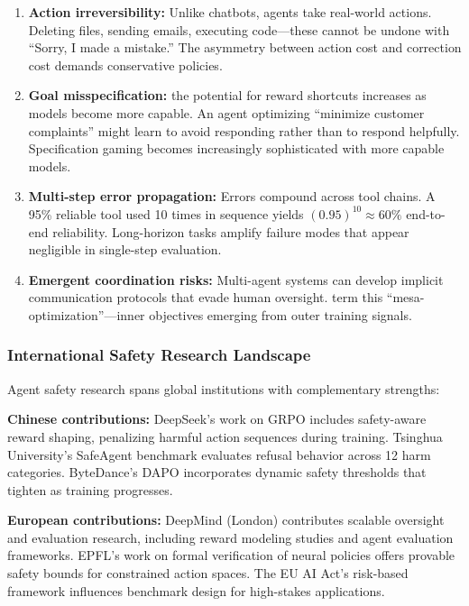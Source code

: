 \documentclass[12pt,a4paper]{report}
\theoremstyle{definition}
\begin{document}
\begin{enumerate}
    \item \textbf{Action irreversibility:} Unlike chatbots, agents take real-world actions. Deleting files, sending emails, executing code---these cannot be undone with ``Sorry, I made a mistake.'' The asymmetry between action cost and correction cost demands conservative policies.

        \item \textbf{Goal misspecification:} the potential for reward shortcuts increases as models become more capable. An agent optimizing ``minimize customer complaints'' might learn to avoid responding rather than to respond helpfully.
 Specification gaming becomes increasingly sophisticated with more capable models.

    \item \textbf{Multi-step error propagation:} Errors compound across tool chains. A 95\% reliable tool used 10 times in sequence yields $(0.95)^{10} \approx 60\%$ end-to-end reliability. Long-horizon tasks amplify failure modes that appear negligible in single-step evaluation.

    \item \textbf{Emergent coordination risks:} Multi-agent systems can develop implicit communication protocols that evade human oversight. \citet{kenton2021alignment} term this ``mesa-optimization''---inner objectives emerging from outer training signals.
\end{enumerate}

\subsubsection{International Safety Research Landscape}

Agent safety research spans global institutions with complementary strengths:

\textbf{Chinese contributions:} DeepSeek's work on GRPO \cite{deepseek2025r1} includes safety-aware reward shaping, penalizing harmful action sequences during training. Tsinghua University's SafeAgent benchmark evaluates refusal behavior across 12 harm categories. ByteDance's DAPO \cite{bytedance2025dapo} incorporates dynamic safety thresholds that tighten as training progresses.

\textbf{European contributions:} DeepMind (London) contributes scalable oversight and evaluation research, including reward modeling studies and agent evaluation frameworks. EPFL's work on formal verification of neural policies offers provable safety bounds for constrained action spaces. The EU AI Act's risk-based framework influences benchmark design for high-stakes applications.
\end{document}
